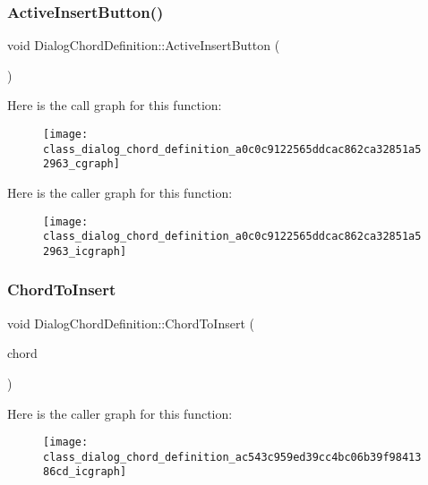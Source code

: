 \subsubsection{Active\+Insert\+Button()}
{\footnotesize\ttfamily void Dialog\+Chord\+Definition\+::\+Active\+Insert\+Button (\begin{DoxyParamCaption}{ }\end{DoxyParamCaption})}

Here is the call graph for this function\+:\nopagebreak
\begin{figure}[H]
\begin{center}
\leavevmode
\texttt{[image: class\_dialog\_chord\_definition\_a0c0c9122565ddcac862ca32851a52963\_cgraph]}
\end{center}
\end{figure}
Here is the caller graph for this function\+:\nopagebreak
\begin{figure}[H]
\begin{center}
\leavevmode
\texttt{[image: class\_dialog\_chord\_definition\_a0c0c9122565ddcac862ca32851a52963\_icgraph]}
\end{center}
\end{figure}
\mbox{\label{class_dialog_chord_definition_ac543c959ed39cc4bc06b39f9841386cd}} 
\subsubsection{Chord\+To\+Insert}
{\footnotesize\ttfamily void Dialog\+Chord\+Definition\+::\+Chord\+To\+Insert (\begin{DoxyParamCaption}\item[{Q\+String}]{chord }\end{DoxyParamCaption})\hspace{0.3cm}{\ttfamily [signal]}}

Here is the caller graph for this function\+:\nopagebreak
\begin{figure}[H]
\begin{center}
\leavevmode
\texttt{[image: class\_dialog\_chord\_definition\_ac543c959ed39cc4bc06b39f9841386cd\_icgraph]}
\end{center}
\end{figure}
\mbox{\label{class_dialog_chord_definition_aac9b456634554d8bedf4c08c1531d8ea}} 
